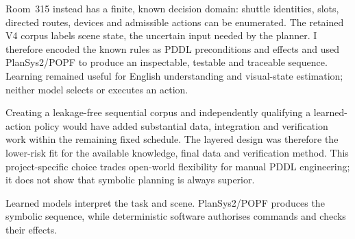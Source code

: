 Room~315 instead has a finite, known decision domain: shuttle identities, slots,
directed routes, devices and admissible actions can be enumerated. The retained
V4 corpus labels scene state, the uncertain input needed by the planner. I
therefore encoded the known rules as PDDL preconditions and effects and used
PlanSys2/POPF to produce an inspectable, testable and traceable sequence.
Learning remained useful for English understanding and visual-state estimation;
neither model selects or executes an action.

Creating a leakage-free sequential corpus and independently qualifying a
learned-action policy would have added substantial data, integration and
verification work within the remaining fixed schedule. The layered design was
therefore the lower-risk fit for the available knowledge, final data and
verification method. This project-specific choice trades open-world flexibility
for manual PDDL engineering; it does not show that symbolic planning is always
superior.

Learned models interpret the task and scene. PlanSys2/POPF produces the symbolic
sequence, while deterministic software authorises commands and checks their
effects.
